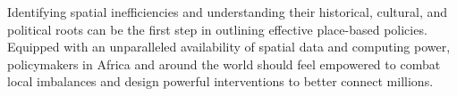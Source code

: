 \documentclass[11pt, oneside]{article}   	%
\renewcommand*\thetable{\Roman{table}}
\begin{document}
Identifying spatial inefficiencies and understanding their historical, cultural, and political roots can be the first step in outlining effective place-based policies. Equipped with an unparalleled availability of spatial data and computing power, policymakers in Africa and around the world should feel empowered to combat local imbalances and design powerful interventions to better connect millions.


\newpage
\begin{spacing}{0.7}

    \setlength{\bibsep}{2.5pt plus 1.5ex}
    

\end{spacing}




  \newpage


  \renewcommand{\thesubsection}{\Alph{subsection}}
  \appendix
  \renewcommand{\thefigure}{A.\arabic{figure}}
  \setcounter{figure}{0}
  \renewcommand{\thetable}{A.\arabic{table}}
  \setcounter{table}{0}
  \renewcommand{\theequation}{A.\arabic{equation}}
  \setcounter{equation}{0}
  \renewcommand{\thefootnote}{A.\arabic{footnote}}
  \setcounter{footnote}{0}
\end{document}
